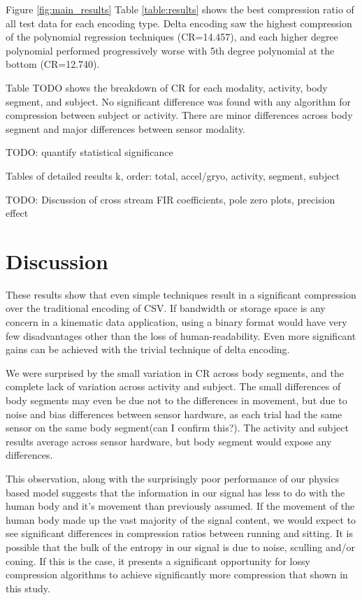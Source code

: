 \documentclass[journal]{IEEEtran}
\begin{document}
Figure \ref{fig:main_results} Table \ref{table:results} shows the best compression ratio of all test data for each encoding type. Delta encoding saw the highest compression of the polynomial regression techniques (CR=14.457), and each higher degree polynomial performed progressively worse with 5th degree polynomial at the bottom (CR=12.740).

Table TODO shows the breakdown of CR for each modality, activity, body segment, and subject. No significant difference was found with any algorithm for compression between subject or activity. There are minor differences across body segment and major differences between sensor modality.

TODO: quantify statistical significance

Tables of detailed results k, order: total, accel/gryo, activity, segment, subject 

TODO: Discussion of cross stream FIR coefficients, pole zero plots, precision effect
\section{Discussion}

These results show that even simple techniques result in a significant compression over the traditional encoding of CSV. If bandwidth or storage space is any concern in a kinematic data application, using a binary format would have very few disadvantages other than the loss of human-readability. Even more significant gains can be achieved with the trivial technique of delta encoding.

We were surprised by the small variation in CR across body segments, and the complete lack of variation across activity and subject. The small differences of body segments may even be due not to the differences in movement, but due to noise and bias differences between sensor hardware, as each trial had the same sensor on the same body segment(can I confirm this?). The activity and subject results average across sensor hardware, but body segment would expose any differences.

This observation, along with the surprisingly poor performance of our physics based model suggests that the information in our signal has less to do with the human body and it's movement than previously assumed. If the movement of the human body made up the vast majority of the signal content, we would expect to see significant differences in compression ratios between running and sitting. It is possible that the bulk of the entropy in our signal is due to noise, sculling and/or coning. If this is the case, it presents a significant opportunity for lossy compression algorithms to achieve significantly more compression that shown in this study.
\end{document}
